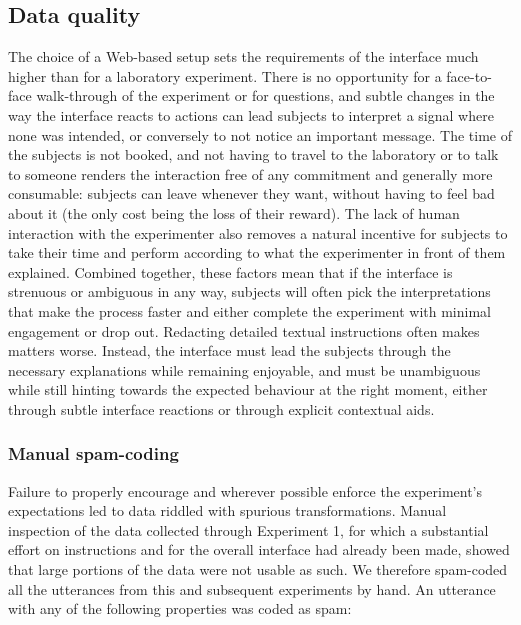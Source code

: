 \subsection{Data quality}\label{data-quality}

The choice of a Web-based setup sets the requirements of the interface
much higher than for a laboratory experiment. There is no opportunity
for a face-to-face walk-through of the experiment or for questions, and
subtle changes in the way the interface reacts to actions can lead
subjects to interpret a signal where none was intended, or conversely to
not notice an important message. The time of the subjects is not booked,
and not having to travel to the laboratory or to talk to someone renders
the interaction free of any commitment and generally more consumable:
subjects can leave whenever they want, without having to feel bad about
it (the only cost being the loss of their reward). The lack of human
interaction with the experimenter also removes a natural incentive for
subjects to take their time and perform according to what the
experimenter in front of them explained. Combined together, these
factors mean that if the interface is strenuous or ambiguous in any way,
subjects will often pick the interpretations that make the process
faster and either complete the experiment with minimal engagement or
drop out. Redacting detailed textual instructions often makes matters
worse. Instead, the interface must lead the subjects through the
necessary explanations while remaining enjoyable, and must be
unambiguous while still hinting towards the expected behaviour at the
right moment, either through subtle interface reactions or through
explicit contextual aids.

\subsubsection{Manual spam-coding}\label{manual-spam-coding}

Failure to properly encourage and wherever possible enforce the
experiment's expectations led to data riddled with spurious
transformations. Manual inspection of the data collected through
Experiment 1, for which a substantial effort on instructions and for the
overall interface had already been made, showed that large portions of
the data were not usable as such. We therefore spam-coded all the
utterances from this and subsequent experiments by hand. An utterance
with any of the following properties was coded as spam:

